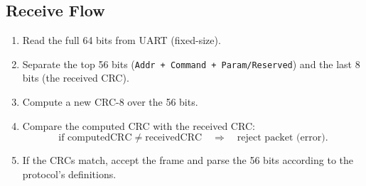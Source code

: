 \documentclass[a4paper,11pt]{article}
\begin{document}
\subsection{Receive Flow}
\begin{enumerate}
  \item Read the full 64 bits from UART (fixed-size).
  \item Separate the top 56 bits (\texttt{Addr + Command + Param/Reserved}) and the last 8 bits (the received CRC).
  \item Compute a new CRC-8 over the 56 bits.
  \item Compare the computed CRC with the received CRC:
    \[
      \text{if } \text{computedCRC} \neq \text{receivedCRC}
      \quad \Longrightarrow \quad
      \text{reject packet (error).}
    \]
  \item If the CRCs match, accept the frame and parse the 56 bits according to the protocol’s definitions.
\end{enumerate}
\end{document}
